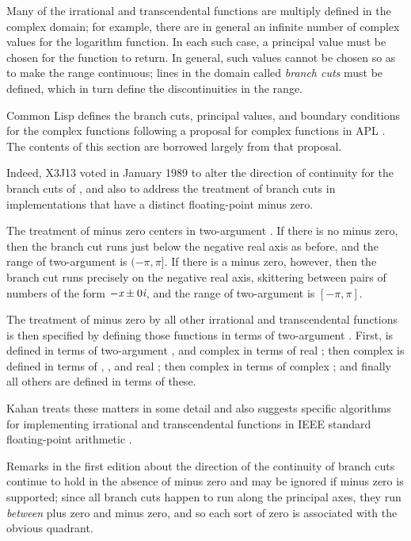 Many of the irrational and transcendental functions are multiply defined
in the complex domain; for example, there are in general an infinite
number of complex values for the logarithm function.  In each such
case, a principal value must be chosen for the function to return.
In general, such values cannot be chosen so as to make the range
continuous; lines in the domain
called \emph{branch cuts} must be defined, which in turn
define the discontinuities in the range.

Common Lisp defines the branch cuts, principal values, and boundary
conditions for the complex functions following
a proposal for complex functions in APL \cite{APL-BRANCH-CUTS}.
The contents of this section are borrowed largely from that proposal.

\begin{new}
Indeed, X3J13 voted in January 1989
to alter the direction of continuity for
the branch cuts of , and also
to address the treatment of branch cuts
in implementations that have a distinct floating-point minus zero.

The treatment of minus zero centers in two-argument .
If there is no minus zero, then the branch cut runs just below the negative real
axis as before, and the range of two-argument  is $(-\pi,\pi]$.
If there is a minus zero, however, then the branch cut runs precisely on the negative real
axis, skittering between pairs of numbers of the form $-\emph{x}\pm 0\emph{i}$,
and the range of two-argument  is $[-\pi,\pi]$.

The treatment of minus zero by all other irrational and transcendental functions
is then specified by defining those functions in terms of two-argument .
First,  is defined in terms of two-argument , and
complex  in terms of real ;
then complex  is defined in terms of , , and real ;
then complex  in terms of complex ;
and finally all others are defined in terms of these.

Kahan \cite{KAHAN-COMPLEX-FNS} treats these matters in some detail and also
suggests specific algorithms for implementing irrational and transcendental functions
in IEEE standard floating-point arithmetic \cite{IEEE-PROPOSED-FLOATING-POINT-STANDARD}.

Remarks in the first edition about the direction of the continuity of branch
cuts continue to hold in the absence of minus zero and may be ignored if minus zero
is supported; since all branch cuts happen to run along the principal axes, they
run \emph{between} plus zero and minus zero, and so each sort of zero is associated
with the obvious quadrant.
\end{new}

